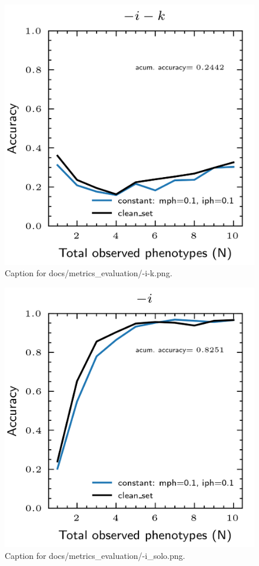 \documentclass{article}
\begin{document}
\begin{figure}[h] \centering \includegraphics{docs/metrics_evaluation/-i-k.png} \caption{Caption for docs/metrics_evaluation/-i-k.png.} \end{figure}
\begin{figure}[h] \centering \includegraphics{docs/metrics_evaluation/-i_solo.png} \caption{Caption for docs/metrics_evaluation/-i_solo.png.} \end{figure}
\end{document}
